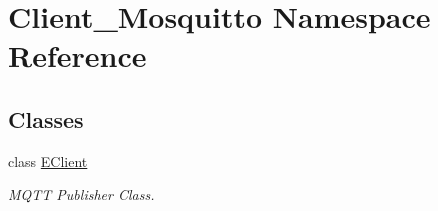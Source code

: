 \hypertarget{namespace_client___mosquitto}{}\section{Client\+\_\+\+Mosquitto Namespace Reference}
\label{namespace_client___mosquitto}
\subsection*{Classes}
\begin{DoxyCompactItemize}
\item 
class \mbox{\hyperlink{class_client___mosquitto_1_1_e_client}{E\+Client}}
\begin{DoxyCompactList}\small\item\em M\+Q\+TT Publisher Class. \end{DoxyCompactList}\end{DoxyCompactItemize}

